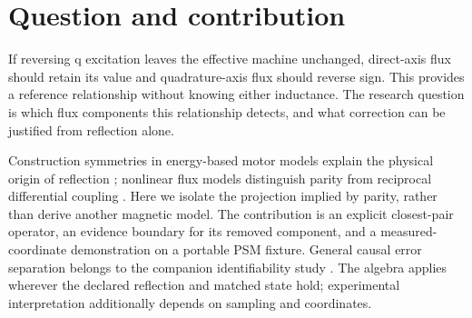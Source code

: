 \section{Question and contribution}
If reversing q excitation leaves the effective machine unchanged, direct-axis
flux should retain its value and quadrature-axis flux should reverse sign.
This provides a reference relationship without knowing either inductance.
The research question is which flux components this relationship detects,
and what correction can be justified from reflection alone.

Construction symmetries in energy-based motor models explain the physical
origin of reflection \cite{jebai2014}; nonlinear flux models distinguish
parity from reciprocal differential coupling \cite{sun2020}. Here we isolate
the projection implied by parity, rather than derive another magnetic model.
The contribution is an explicit closest-pair operator, an evidence boundary
for its removed component, and a measured-coordinate demonstration on a
portable PSM fixture. General causal error separation belongs to the companion
identifiability study \cite{companion-diagnostics}.
The algebra applies wherever the declared reflection and matched state hold;
experimental interpretation additionally depends on sampling and coordinates.

